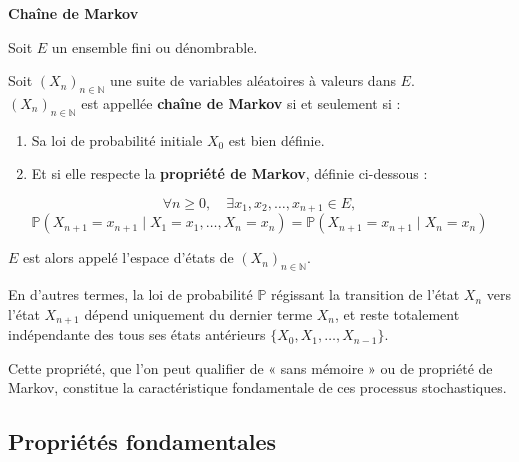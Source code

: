 \documentclass{article}
\begin{document}
\noindent\textbf{Chaîne de Markov}
\begin{leftbar}
Soit $E$ un ensemble fini ou dénombrable.

Soit $(X_n)_{n \in \mathbb{N}}$ une suite de variables aléatoires à valeurs dans $E$. \\

$(X_n)_{n \in \mathbb{N}}$ est appellée \textbf{chaîne de Markov} si et seulement si :
\begin{enumerate}[leftmargin=5em, label=(\arabic*)]
  \item Sa loi de probabilité initiale $X_0$ est bien définie.
  \item Et si elle respecte la \textbf{propriété de Markov}, définie ci-dessous :
\end{enumerate}
\[
\forall n \geq 0, \quad \exists x_1, x_2, \dots, x_{n+1} \in E,
\]
\[
\mathbb{P}(X_{n+1} = x_{n+1} \mid X_1 = x_1, \dots, X_n = x_n) = \mathbb{P}(X_{n+1} = x_{n+1} \mid X_n = x_n)
\]

\medskip
$E$ est alors appelé l'espace d'états de $(X_n)_{n \in \mathbb{N}}$.
\end{leftbar}

En d'autres termes, la loi de probabilité $\mathbb{P}$ régissant la transition de l'état $X_n$ vers l'état $X_{n+1}$ dépend uniquement du dernier terme $X_n$, et reste totalement indépendante des tous ses états antérieurs $\{X_0, X_1, \dots, X_{n-1}\}$.

Cette propriété, que l'on peut qualifier de « sans mémoire » ou de propriété de Markov, constitue la caractéristique fondamentale de ces processus stochastiques.


\subsection{Propriétés fondamentales}

\end{document}
